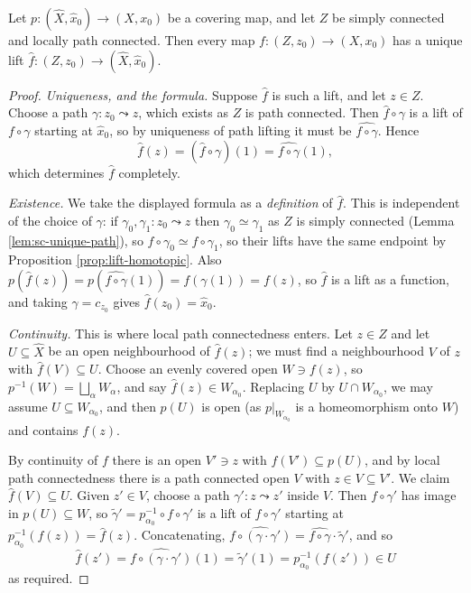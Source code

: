 \documentclass[a4paper]{scrartcl}
\begin{document}
\begin{proposition} \label{prop:sc-lifting}
	Let $p: (\hat X, \hat x_0) \to (X, x_0)$ be a covering map, and let $Z$ be simply connected and locally path connected. Then every map $f: (Z, z_0) \to (X, x_0)$ has a unique lift $\hat f: (Z, z_0) \to (\hat X, \hat x_0)$.
\end{proposition}
\begin{proof}
	\emph{Uniqueness, and the formula.} Suppose $\hat f$ is such a lift, and let $z \in Z$. Choose a path $\gamma: z_0 \leadsto z$, which exists as $Z$ is path connected. Then $\hat f \circ \gamma$ is a lift of $f \circ \gamma$ starting at $\hat x_0$, so by uniqueness of path lifting it must be $\widehat{f \circ \gamma}$. Hence
	$$
	\hat f(z) = (\hat f \circ \gamma)(1) = \widehat{f\circ\gamma}(1),
	$$
	which determines $\hat f$ completely.

	\emph{Existence.} We take the displayed formula as a \emph{definition} of $\hat f$. This is independent of the choice of $\gamma$: if $\gamma_0, \gamma_1: z_0 \leadsto z$ then $\gamma_0 \simeq \gamma_1$ as $Z$ is simply connected (Lemma \ref{lem:sc-unique-path}), so $f \circ \gamma_0 \simeq f\circ\gamma_1$, so their lifts have the same endpoint by Proposition \ref{prop:lift-homotopic}. Also $p(\hat f(z)) = p(\widehat{f\circ\gamma}(1)) = f(\gamma(1)) = f(z)$, so $\hat f$ is a lift as a function, and taking $\gamma = c_{z_0}$ gives $\hat f(z_0) = \hat x_0$.

	\emph{Continuity.} This is where local path connectedness enters. Let $z \in Z$ and let $U \subseteq \hat X$ be an open neighbourhood of $\hat f(z)$; we must find a neighbourhood $V$ of $z$ with $\hat f(V) \subseteq U$. Choose an evenly covered open $W \ni f(z)$, so $p^{-1}(W) = \bigsqcup_\alpha W_\alpha$, and say $\hat f(z) \in W_{\alpha_0}$. Replacing $U$ by $U \cap W_{\alpha_0}$, we may assume $U \subseteq W_{\alpha_0}$, and then $p(U)$ is open (as $p|_{W_{\alpha_0}}$ is a homeomorphism onto $W$) and contains $f(z)$.

	By continuity of $f$ there is an open $V' \ni z$ with $f(V') \subseteq p(U)$, and by local path connectedness there is a path connected open $V$ with $z \in V \subseteq V'$. We claim $\hat f(V) \subseteq U$. Given $z' \in V$, choose a path $\gamma': z \leadsto z'$ inside $V$. Then $f \circ \gamma'$ has image in $p(U) \subseteq W$, so $\tilde\gamma' = p_{\alpha_0}^{-1} \circ f \circ \gamma'$ is a lift of $f \circ \gamma'$ starting at $p_{\alpha_0}^{-1}(f(z)) = \hat f(z)$. Concatenating, $\widehat{f\circ(\gamma\cdot\gamma')} = \widehat{f\circ\gamma}\cdot\tilde\gamma'$, and so
	$$
	\hat f(z') = \widehat{f\circ(\gamma\cdot\gamma')}(1) = \tilde\gamma'(1) = p_{\alpha_0}^{-1}(f(z')) \in U
	$$
	as required.
\end{proof}
\end{document}
